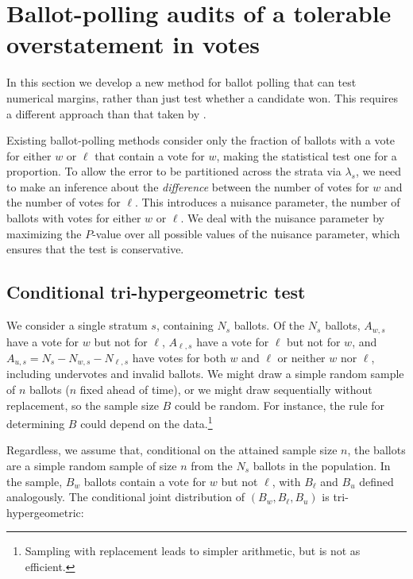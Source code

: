 \section{Ballot-polling audits of a tolerable overstatement in votes}
\label{sec:ballotPollError}

In this section we develop a new method for ballot polling that can test numerical margins,
rather than just test whether a candidate won.
This requires a different approach than that taken by \cite{lindemanEtal12}.

Existing ballot-polling methods consider only the fraction of ballots with a vote for either 
$w$ or $\ell$ that contain a vote for $w$,
making the statistical test one for a proportion.
To allow the error to be partitioned across the strata via $\lambda_s$,
we need to make an inference about the 
\emph{difference} between the number of votes for $w$ and the number of votes for $\ell$.
This introduces a nuisance parameter, the number of ballots with votes for either $w$ or $\ell$.
We deal with the nuisance parameter by maximizing the $P$-value 
over all possible values of the nuisance parameter, which ensures that the test is conservative.

\subsection{Conditional tri-hypergeometric test}

We consider a single stratum $s$, containing $N_s$ ballots.
Of the $N_s$ ballots,
$A_{w,s}$ have a vote for $w$ but not for $\ell$, $A_{\ell,s}$ have a vote for $\ell$ but not for $w$, and $A_{u,s} = N_s - N_{w,s} - N_{\ell,s}$ have votes for both $w$ and $\ell$ or neither $w$ nor $\ell$, including undervotes and invalid ballots.
We might draw a simple random sample of $n$ ballots ($n$ fixed ahead of time), or we might draw 
sequentially without replacement, so the sample size $B$ could be random.
For instance, the rule for determining $B$ could depend on the data.\footnote{%
   Sampling with replacement leads to simpler arithmetic, but is not as efficient.
}

Regardless, we assume that, conditional on the attained sample size $n$, the ballots are a simple random sample of size $n$ from the $N_s$ ballots in the population.
In the sample, $B_w$ ballots contain a vote for $w$ but not $\ell$, with $B_\ell$ and $B_u$ defined analogously.
The conditional joint distribution of
$(B_w, B_\ell, B_u)$ is tri-hypergeometric: 

